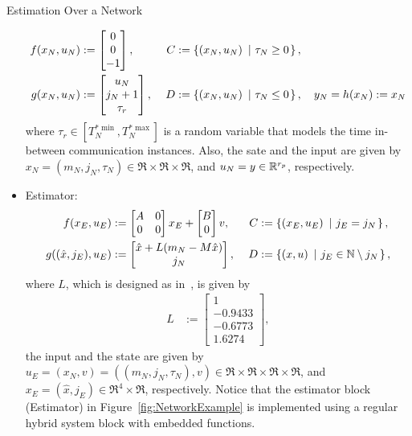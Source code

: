 \begin{example}{Estimation Over a Network}
\begin{itemize}
\begin{align}
f(x_N, u_N)&:= \begin{bmatrix}
0\\0\\-1
\end{bmatrix},\ 
   &C &:= \defset{(x_N,u_N)}{ \tau_N \geq 0 },\\
g(x_N, u_N)&:= \begin{bmatrix}
u_N\\
j_N+1\\
\tau_r
\end{bmatrix},\ 
    &D &:=\defset{(x_N,u_N)}{ \tau_N \leq 0 },\quad 
y_N = h(x_N) : =x_N
\end{align}
where 
$\tau_r\in[T^{*\min}_{N},T^{*\max}_{N}]$ is a random variable that models the time in-between communication instances. Also, the sate and the input are given by $x_N=(m_N,j_N,\tau_N)\in\Re\times\Re\times\Re$, and $u_N=y\in{\mathbb R}^{r_p}$, respectively.
\item Estimator:
\begin{align}
f(x_E, u_E)&:= 
\begin{bmatrix}
A &0 \\ 0 & 0
\end{bmatrix}x_E + \begin{bmatrix}
B\\0
\end{bmatrix}v,\ 
   &C &:= \defset{(x_E,u_E)}{ j_E = j_N },\\ 
g((\hat{x},j_E), u_E)&:= \begin{bmatrix}
\hat{x} + L(m_N-M\hat{x})\\
j_N
\end{bmatrix},\ 
    &D &:=\defset{(x,u)}{ j_E\in\nats\setminus j_N},
\end{align}
where $L$, which is designed as in~\cite{FGST16}, is given by
\begin{align}
L &:= \begin{bmatrix} 1\\ -0.9433\\ -0.6773\\1.6274\end{bmatrix},
\end{align}
the input and the state are given by $u_E = (x_N,v) = ((m_N,j_N,\tau_N),v)\in\Re\times\Re\times\Re\times\Re$, and $x_E=(\hat{x},j_E)\in\Re^{4}\times\Re$, respectively. Notice that the estimator block (Estimator) in Figure~\ref{fig:NetworkExample} is implemented using a regular hybrid system block with embedded functions.


\end{itemize}
\end{example}
